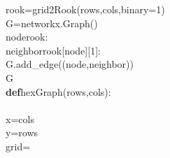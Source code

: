 {{\begin{tabbing}
\hspace{24pt}rook\hspace{6pt}=\hspace{6pt}grid2Rook(rows,cols,binary=1)\\
\hspace{24pt}G\hspace{6pt}=\hspace{6pt}networkx.Graph()\\
\hspace{6pt}node\hspace{6pt}rook:\\
\hspace{6pt}neighbor\hspace{6pt}rook{[}node{]}{[}1{]}:\\
\hspace{72pt}G.add\_edge((node,neighbor))\\
\hspace{6pt}G\\
{\textbf{def}}\hspace{6pt}hexGraph(rows,\hspace{6pt}cols):\\
\\
\hspace{24pt}x\hspace{6pt}=\hspace{6pt}cols\\
\hspace{24pt}y\hspace{6pt}=\hspace{6pt}rows\\
\hspace{24pt}grid\hspace{6pt}=\hspace{6pt}{[}{]}\\

\end{tabbing}}}
